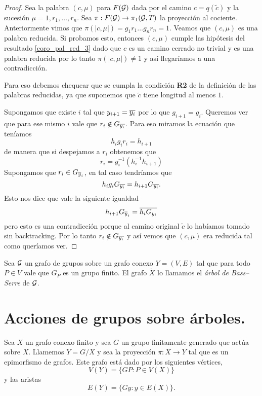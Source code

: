 \documentclass[tesis.tex]{subfiles}
\begin{document}
\begin{proof}
	
	Sea la palabra $(c, \mu)$ para $F({\cal G})$ dada por el camino $c= q(\tilde c)$ y la sucesión $\mu = 1,r_1, \dots, r_n$.
	Sea $\pi:F({\cal G}) \to \pi_1({\cal G},T)$ la proyección al cociente.
	Anteriormente vimos que $\pi(|c, \mu|) = g_1r_1\dots g_nr_n = 1$.
	Veamos que $(c, \mu)$ es una palabra reducida.
	Si probamos esto, entonces $(c, \mu)$ cumple las hipótesis del resultado \ref{coro_pal_red_3} dado que $c$ es un camino cerrado no trivial y es una palabra reducida por lo tanto $\pi(|c, \mu|) \neq 1$ y así llegaríamos a una contradicción.

	Para eso debemos chequear que se cumpla la condición \textbf{R2} de la definición de las palabras reducidas, ya que suponemos que $\tilde c$ tiene longitud al menos $1$.
	
	Supongamos que existe $i$ tal que $y_{i+1} = \overline{y_i}$ por lo que $g_{i+1} = g_{i}$.
	Queremos ver que para ese mismo $i$ vale que $r_i \notin G_{\overline{y_{i}}}$.
	Para eso miramos la ecuación que teníamos 
	\[
		h_ig_ir_i = h_{i+1}
	\]
	de manera que si despejamos a $r_{i}$ obtenemos que
	\[
		r_i =   g_i^{-1}(h_i^{-1} h_{i+1} )
	\]
	Supongamos que $r_{i} \in G_{\overline y_{i}}$, en tal caso tendríamos que 
	\[
		h_ig_i G_{\overline{y_i}} = h_{i+1}G_{\overline{y_i}}.
	\] 
	Esto nos dice que vale la siguiente igualdad 
	\[
	h_{i+1}G_{\overline y_{i}} = \overline{h_{i}G_{y_i}}
	\]
	pero esto es una contradicción porque al camino original $\tilde c$ lo habíamos tomado sin backtracking. 
	Por lo tanto $r_{i} \notin G_{\overline{y_{i}}}$ y así vemos que $(c, \mu)$ era reducida tal como queríamos ver.
	
\end{proof}


\begin{deff}
	Sea ${\cal G}$ un grafo de grupos sobre un grafo conexo $Y=(V,E)$ tal que para todo $P \in V$ vale que $G_{P}$ es un grupo finito.	
	El grafo $\tilde X$ lo llamamos el \emph{árbol de Bass--Serre} de ${\cal G}$.
\end{deff}
\section{Acciones de grupos sobre árboles.}

Sea $X$ un grafo conexo finito y sea $G$ un grupo finitamente generado que actúa sobre $X$.
Llamemos $Y = G / X$ y sea la proyección $\pi: X \to Y$ tal que es un epimorfismo de grafos.
Este grafo está dado por los siguientes vértices,
\[
	V(Y) = \{ G P :  P \in V(X)    \}
\]
y las  aristas 
\[
	E(Y) = \{  Gy  : y \in E(X)  \}.
\]
\end{document}
